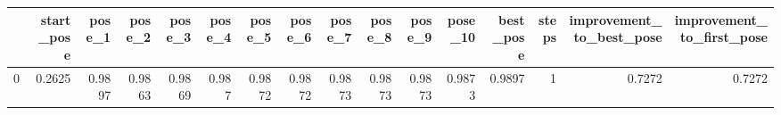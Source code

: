 \begin{tabular}{lrrrrrrrrrrrrrrr}
\toprule
{} &  start\_pose &  pose\_1 &  pose\_2 &  pose\_3 &  pose\_4 &  pose\_5 &  pose\_6 &  pose\_7 &  pose\_8 &  pose\_9 &  pose\_10 &  best\_pose &  steps &  improvement\_to\_best\_pose &  improvement\_to\_first\_pose \\
\midrule
0 &      0.2625 &  0.9897 &  0.9863 &  0.9869 &   0.987 &  0.9872 &  0.9872 &  0.9873 &  0.9873 &  0.9873 &   0.9873 &     0.9897 &      1 &                    0.7272 &                     0.7272 \\
\bottomrule
\end{tabular}
